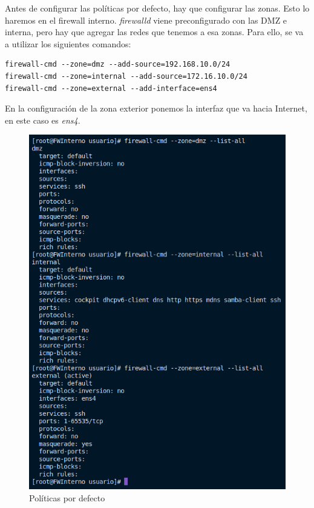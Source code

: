 \documentclass[11pt]{report}
\begin{document}
Antes de configurar las políticas por defecto, hay que configurar las zonas. Esto lo haremos en el firewall interno.
\emph{firewalld} viene preconfigurado con las DMZ e interna, pero hay que agregar las redes que tenemos a esa zonas. 
Para ello, se va a utilizar los siguientes comandos:
\begin{verbatim}
firewall-cmd --zone=dmz --add-source=192.168.10.0/24
firewall-cmd --zone=internal --add-source=172.16.10.0/24
firewall-cmd --zone=external --add-interface=ens4
\end{verbatim}

En la configuración de la zona exterior ponemos la interfaz que va hacia Internet, en este caso es \emph{ens4}.
\begin{figure}[H]
  \centering
  \includegraphics[scale=0.5]{img/resultado_politicas_por_defecto.png}
  \caption{Políticas por defecto}
  \label{fig:politicas por defecto}
\end{figure}
\end{document}
